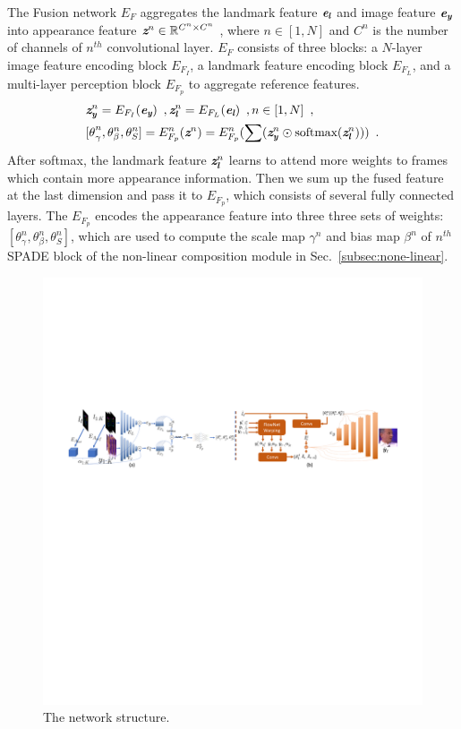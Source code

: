 \documentclass[runningheads]{llncs}
\def\mathbi#1{\textbf{\em #1}}
\begin{document}
\indent The Fusion network $E_{F}$ aggregates the landmark feature $\mathbi{e}_{\mathbi{l}}$ and image feature $\mathbi{e}_{\mathbi{y}} $ into appearance feature $\mathbi{z}^{n} \in \mathbb{R}^{C^n \times C^n} $ , where $n \in [1,N]$ and $C^n$ is the number of channels of $n^{th}$ convolutional layer. $E_{F}$ consists of three blocks: a $N$-layer image feature encoding block $E_{F_{I}}$, a landmark feature encoding block $E_{F_L}$, and a multi-layer perception block $E_{F_{p}}$ to aggregate reference features.
\begin{align}
\label{eq:embed2}
&\mathbi{z}_{\mathbi{y}}^n =  E_{F_I}(\mathbi{e}_{\mathbi{y}} )
\enspace,  \mathbi{z}_{\mathbi{l}}^n =  E_{F_L}(\mathbi{e}_{\mathbi{l}}) \enspace, n \in [1, N]  \enspace,\\
\label{eq:fusion}
&{[\theta}^n_{\gamma}, {\theta}^n_{\beta}, {\theta}^n_{S}]  =  E^n_{F_p}( \mathbi{z}^n)=  E^n_{F_p}( \sum(\mathbi{z}_{\mathbi{y}}^n \odot  {\text{softmax}}( \mathbi{z}_{\mathbi{l}}^n) ))
\enspace.
\end{align}
After softmax, the landmark feature $\mathbi{z}_{\mathbi{l}}^n$ learns to attend more weights to frames which contain more appearance information. Then we sum up the fused feature at the last dimension and pass it to $E_{F_{p}}$, which consists of several fully connected layers. The $E_{F_{p}}$ encodes the appearance feature into three  three sets of weights: $[{\theta}^n_{\gamma}, {\theta}^n_{\beta}, {\theta}^n_{S}]$, which are used to compute the scale map $\gamma^n$ and bias map $\beta^n$ of $n^{th}$ SPADE block of the non-linear composition module in Sec.~\ref{subsec:none-linear}.

\begin{figure}[t]
\includegraphics[width= \linewidth]{latex/images/embed_gan.pdf}
\caption{The network structure.}
\label{fig:embed_gan}
\end{figure}
\end{document}
